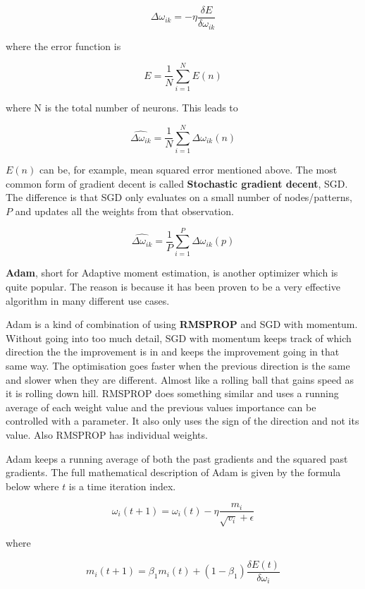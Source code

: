 \[ \Delta \omega_{ik} = -\eta \frac{\delta E}{\delta \omega_{ik}} \]

\begin{center}
where the error function is
\end{center}

\[E = \frac{1}{N} \displaystyle\sum_{i=1}^{N} E(n) \]

\begin{center}
where N is the total number of neurons. This leads to
\end{center}

\[ \hat{\Delta\omega_{ik}} = \frac{1}{N}  \displaystyle\sum_{i=1}^{N} \Delta\omega_{ik}(n) \]

$ E(n) $ can be, for example, mean squared error mentioned above.
The most common form of gradient decent is called \textbf{Stochastic gradient decent}, SGD.
The difference is that SGD only evaluates on a small number of nodes/patterns, $P$ and updates all the weights from that observation.

\[ \hat{\Delta\omega_{ik}} = \frac{1}{P}  \displaystyle\sum_{i=1}^{P} \Delta\omega_{ik}(p) \]

\textbf{Adam}\cite{adamoptimizer}, short for Adaptive moment estimation, is another optimizer which is quite popular.
The reason is because it has been proven to be a very effective algorithm in many different use cases.

Adam is a kind of combination of using \textbf{RMSPROP}\cite{rmsprop} and SGD with momentum.
Without going into too much detail, SGD with momentum keeps track of which direction the the improvement is in and keeps the improvement going in that same way. The optimisation goes faster when the previous direction is the same and slower when they are different. Almost like a rolling ball that gains speed as it is rolling down hill.
RMSPROP does something similar and uses a running average of each weight value and the previous values importance can be controlled with a parameter. It also only uses the sign of the direction and not its value. Also RMSPROP has individual weights.

Adam keeps a running average of both the past gradients and the squared past gradients.
The full mathematical description of Adam is given by the formula below where
$t$ is a time iteration index.

\[ \omega_i (t+1) = \omega_i(t) - \eta \frac{m_i}{\sqrt{v_i} + \epsilon} \]

where

\[ m_i (t+1) = \beta_1m_i(t) + (1 - \beta_1) \frac{ \delta E(t) }{\delta\omega_i} \]


